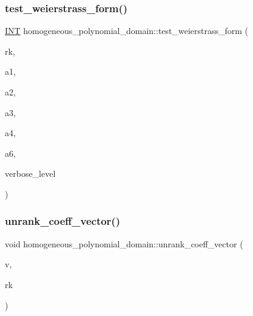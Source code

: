 \subsubsection{\texorpdfstring{test\+\_\+weierstrass\+\_\+form()}{test\_weierstrass\_form()}}
{\footnotesize\ttfamily \mbox{\hyperlink{galois_8h_a09fddde158a3a20bd2dcadb609de11dc}{I\+NT}} homogeneous\+\_\+polynomial\+\_\+domain\+::test\+\_\+weierstrass\+\_\+form (\begin{DoxyParamCaption}\item[{\mbox{\hyperlink{galois_8h_a09fddde158a3a20bd2dcadb609de11dc}{I\+NT}}}]{rk,  }\item[{\mbox{\hyperlink{galois_8h_a09fddde158a3a20bd2dcadb609de11dc}{I\+NT}} \&}]{a1,  }\item[{\mbox{\hyperlink{galois_8h_a09fddde158a3a20bd2dcadb609de11dc}{I\+NT}} \&}]{a2,  }\item[{\mbox{\hyperlink{galois_8h_a09fddde158a3a20bd2dcadb609de11dc}{I\+NT}} \&}]{a3,  }\item[{\mbox{\hyperlink{galois_8h_a09fddde158a3a20bd2dcadb609de11dc}{I\+NT}} \&}]{a4,  }\item[{\mbox{\hyperlink{galois_8h_a09fddde158a3a20bd2dcadb609de11dc}{I\+NT}} \&}]{a6,  }\item[{\mbox{\hyperlink{galois_8h_a09fddde158a3a20bd2dcadb609de11dc}{I\+NT}}}]{verbose\+\_\+level }\end{DoxyParamCaption})}

\mbox{\label{classhomogeneous__polynomial__domain_a88b548127853c2f9a2a6a2de8d2ce782}} 
\subsubsection{\texorpdfstring{unrank\+\_\+coeff\+\_\+vector()}{unrank\_coeff\_vector()}}
{\footnotesize\ttfamily void homogeneous\+\_\+polynomial\+\_\+domain\+::unrank\+\_\+coeff\+\_\+vector (\begin{DoxyParamCaption}\item[{\mbox{\hyperlink{galois_8h_a09fddde158a3a20bd2dcadb609de11dc}{I\+NT}} $\ast$}]{v,  }\item[{\mbox{\hyperlink{galois_8h_a09fddde158a3a20bd2dcadb609de11dc}{I\+NT}}}]{rk }\end{DoxyParamCaption})}

